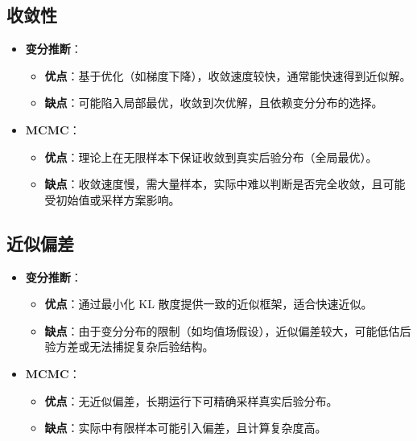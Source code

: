 \documentclass{article}
\begin{document}
\subsection*{收敛性}
\begin{itemize}
    \item \textbf{变分推断}：
    \begin{itemize}
        \item \textbf{优点}：基于优化（如梯度下降），收敛速度较快，通常能快速得到近似解。
        \item \textbf{缺点}：可能陷入局部最优，收敛到次优解，且依赖变分分布的选择。
    \end{itemize}
    \item \textbf{MCMC}：
    \begin{itemize}
        \item \textbf{优点}：理论上在无限样本下保证收敛到真实后验分布（全局最优）。
        \item \textbf{缺点}：收敛速度慢，需大量样本，实际中难以判断是否完全收敛，且可能受初始值或采样方案影响。
    \end{itemize}
\end{itemize}

\subsection*{近似偏差}
\begin{itemize}
    \item \textbf{变分推断}：
    \begin{itemize}
        \item \textbf{优点}：通过最小化 KL 散度提供一致的近似框架，适合快速近似。
        \item \textbf{缺点}：由于变分分布的限制（如均值场假设），近似偏差较大，可能低估后验方差或无法捕捉复杂后验结构。
    \end{itemize}
    \item \textbf{MCMC}：
    \begin{itemize}
        \item \textbf{优点}：无近似偏差，长期运行下可精确采样真实后验分布。
        \item \textbf{缺点}：实际中有限样本可能引入偏差，且计算复杂度高。
    \end{itemize}
\end{itemize}
\end{document}
